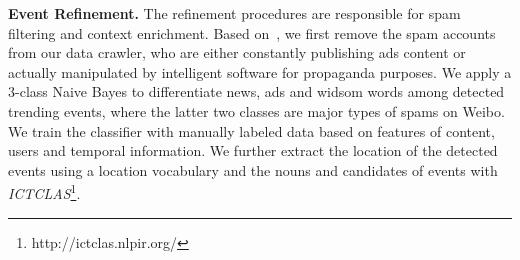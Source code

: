 \noindent\textbf{Event Refinement.}
\label{refinement}
The refinement procedures are responsible for spam filtering and context enrichment.
Based on~\cite{liu2013many}, we first remove the spam accounts from our data crawler,
who are either constantly publishing ads content or actually manipulated by intelligent software for propaganda purposes.
We apply a 3-class Naive Bayes to differentiate news, ads and widsom words among detected trending events,
where the latter two classes are major types of spams on Weibo.
We train the classifier with manually labeled data based on features of content, users and temporal information.
We further extract the location of the detected events using a location vocabulary
and the nouns and candidates of events with \emph{ICTCLAS}\footnote{http://ictclas.nlpir.org/}.

